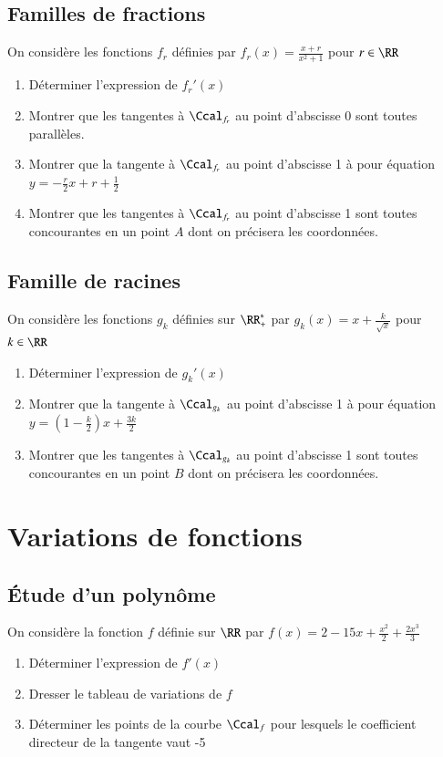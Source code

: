 \documentclass[oneside,12pt]{article}          %
\begin{document}
\subsection{Familles de fractions}
On considère les fonctions $f_r$ définies par $f_r(x)=\frac{x+r}{x^2+1}$ pour $r\in\RR$
    \begin{enumerate}
        \item Déterminer l'expression de $f_r'(x)$
        \item Montrer que les tangentes à $\Ccal_{f_r}$ au point d'abscisse 0 sont toutes parallèles.
        \item Montrer que la tangente à $\Ccal_{f_r}$ au point d'abscisse 1 à pour équation $y=-\frac{r}{2}x+r+\frac{1}{2}$
        \item Montrer que les tangentes à $\Ccal_{f_r}$ au point d'abscisse 1 sont toutes concourantes en un point $A$ dont on précisera les coordonnées.
    \end{enumerate}



\subsection{Famille de racines}
On considère les fonctions $g_k$ définies sur $\RR_+^*$ par $g_k(x)=x+\frac{k}{\sqrt{x}}$ pour $k\in\RR$
    \begin{enumerate}
        \item Déterminer l'expression de $g_k'(x)$
        \item Montrer que la tangente à $\Ccal_{g_k}$ au point d'abscisse 1 à pour équation $y=(1-\frac{k}{2})x+\frac{3k}{2}$
        \item Montrer que les tangentes à $\Ccal_{g_k}$ au point d'abscisse 1 sont toutes concourantes en un point $B$ dont on précisera les coordonnées.
    \end{enumerate}




\section{Variations de fonctions}

\subsection{Étude d'un polynôme}
On considère la fonction $f$ définie sur $\RR$ par $f(x)=2-15 x + \frac{x^2}{2} + \frac{2 x^3}{3}$
\begin{enumerate}
    \item Déterminer l'expression de $f'(x)$
    \item Dresser le tableau de variations de $f$
    \item Déterminer les points de la courbe $\Ccal_f$ pour lesquels le coefficient directeur de la tangente vaut -5
\end{enumerate}
\end{document}
